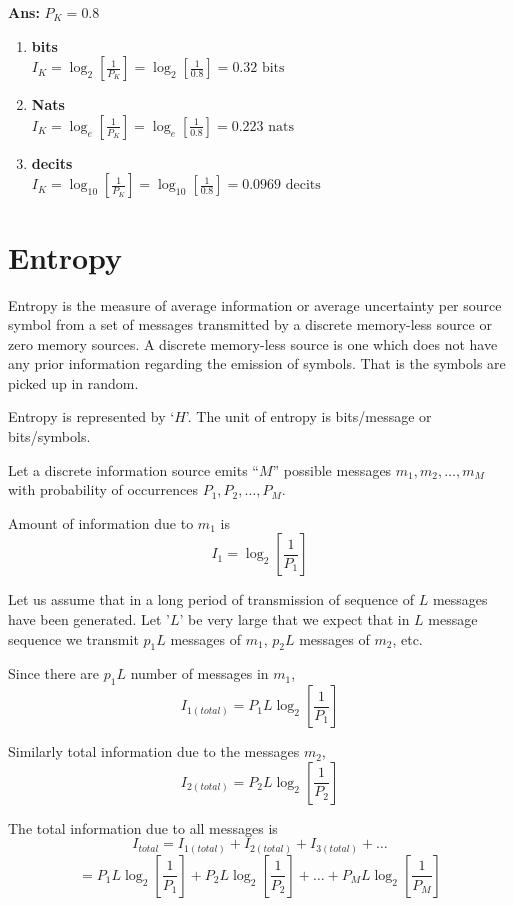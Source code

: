 \documentclass[12pt]{article}
\begin{document}
\textbf{Ans:} $P_K = 0.8$
\begin{enumerate}
	\item[i.] \textbf{bits}\\
	      $I_K = \log_2 \left[ \frac{1}{P_K} \right] = \log_2 \left[ \frac{1}{0.8} \right] = 0.32 \text{ bits}$
	\item[ii.] \textbf{Nats}\\
	      $I_K = \log_e \left[ \frac{1}{P_K} \right] = \log_e \left[ \frac{1}{0.8} \right] = 0.223 \text{ nats}$
	\item[iii.] \textbf{decits}\\
	      $I_K = \log_{10} \left[ \frac{1}{P_K} \right] = \log_{10} \left[ \frac{1}{0.8} \right] = 0.0969 \text{ decits}$
\end{enumerate}

\section{Entropy}
Entropy is the measure of average information or average uncertainty per source symbol from a set of messages transmitted by a discrete memory-less source or zero memory sources. A discrete memory-less source is one which does not have any prior information regarding the emission of symbols. That is the symbols are picked up in random.

Entropy is represented by `$H$'. The unit of entropy is bits/message or bits/symbols.

Let a discrete information source emits ``$M$'' possible messages $m_1, m_2, \ldots, m_M$ with probability of occurrences $P_1, P_2, \ldots, P_M$.

Amount of information due to $m_1$ is
$$I_1 = \log_2 \left[ \frac{1}{P_1} \right]$$

Let us assume that in a long period of transmission of sequence of $L$ messages have been generated. Let '$L$' be very large that we expect that in $L$ message sequence we transmit $p_1 L$ messages of $m_1$, $p_2 L$ messages of $m_2$, etc.

Since there are $p_1 L$ number of messages in $m_1$,
$$I_{1(total)} = P_1 L \log_2 \left[ \frac{1}{P_1} \right]$$

Similarly total information due to the messages $m_2$,
$$I_{2(total)} = P_2 L \log_2 \left[ \frac{1}{P_2} \right]$$

The total information due to all messages is
$$I_{total} = I_{1(total)} + I_{2(total)} + I_{3(total)} + \ldots$$
$$= P_1 L \log_2 \left[ \frac{1}{P_1} \right] + P_2 L \log_2 \left[ \frac{1}{P_2} \right] + \ldots + P_M L \log_2 \left[ \frac{1}{P_M} \right]$$
\end{document}
